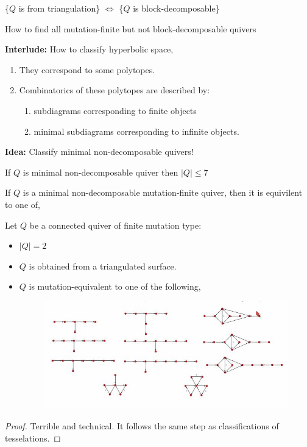 \documentclass{article}
\begin{document}
\begin{prop}
  \{$Q$ is from triangulation\} $\iff$ \{$Q$ is block-decomposable\}
\end{prop}

\begin{question}
  How to find all mutation-finite but not block-decomposable quivers
\end{question}

\textbf{Interlude:} How to classify hyperbolic space,\\
\begin{enumerate}
  \item They correspond to some polytopes.
  \item Combinatorics of these polytopes are described by:
  \begin{enumerate}
    \item subdiagrams corresponding to finite objects
    \item minimal subdiagrams corresponding to infinite objects.
  \end{enumerate}
\end{enumerate}

\textbf{Idea:} Classify minimal non-decomposable quivers!

\begin{nlemma}[]
  If $Q$ is minimal non-decomposable quiver then $|Q| \le 7$
\end{nlemma}

\begin{nlemma}[]
  If $Q$ is a minimal non-decomposable mutation-finite quiver, then it is equivilent to one of,

\end{nlemma}


\begin{nthm}[]
  Let $Q$ be a connected quiver of finite mutation type:
  \begin{itemize}
    \item $|Q| = 2$
    \item $Q$ is obtained from a triangulated surface.
    \item $Q$ is mutation-equivalent to one of the following,
    \begin{figure}[!ht]
    \centering
    \includegraphics{./figures/L3.9}
    \end{figure}
  \end{itemize}
\end{nthm}

\begin{proof}
  Terrible and technical. It follows the same step as classifications of tesselations.
\end{proof}
\end{document}
